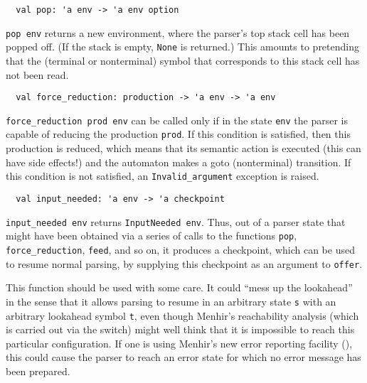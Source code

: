 \documentclass[onecolumn,11pt,nocopyrightspace,preprint]{sigplanconf}
\begin{document}

\begin{verbatim}
  val pop: 'a env -> 'a env option
\end{verbatim}

\verb+pop env+ returns a new environment, where the parser's top stack cell
has been popped off. (If the stack is empty, \verb+None+ is returned.) This
amounts to pretending that the (terminal or nonterminal) symbol that
corresponds to this stack cell has not been read.


\begin{verbatim}
  val force_reduction: production -> 'a env -> 'a env
\end{verbatim}

\verb+force_reduction prod env+ can be called only if in the state \verb+env+
the parser is capable of reducing the production \verb+prod+. If this
condition is satisfied, then this production is reduced, which means that its
semantic action is executed (this can have side effects!) and the automaton
makes a goto (nonterminal) transition. If this condition is not satisfied, an
\verb+Invalid_argument+ exception is raised.


\begin{verbatim}
  val input_needed: 'a env -> 'a checkpoint
\end{verbatim}

\verb+input_needed env+ returns \verb+InputNeeded env+. Thus, out of a parser
state that might have been obtained via a series of calls to the functions
\verb+pop+, \verb+force_reduction+, \verb+feed+, and so on, it produces a
checkpoint, which can be used to resume normal parsing, by supplying this
checkpoint as an argument to \verb+offer+.

This function should be used with some care. It could ``mess up the
lookahead'' in the sense that it allows parsing to resume in an arbitrary
state \verb+s+ with an arbitrary lookahead symbol \verb+t+, even though
Menhir's reachability analysis (which is carried out via the \olisterrors
switch) might well think that it is impossible to reach this particular
configuration. If one is using Menhir's new error reporting facility
(), this could cause the parser to reach an error state
for which no error message has been prepared.

\end{document}
